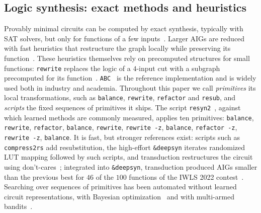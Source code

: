 \documentclass{article}
\begin{document}
\subsection{Logic synthesis: exact methods and heuristics}\label{sec:abc}
Provably minimal circuits can be computed by exact synthesis, typically with SAT solvers, but only for functions of a few inputs~\cite{exact-synthesis}.
Larger AIGs are reduced with fast heuristics that restructure the graph locally while preserving its function~\cite{rewriting,Mishchenko2006ScalableLS,resub}.
These heuristics themselves rely on precomputed structures for small functions: \texttt{rewrite} replaces the logic of a $4$-input cut with a subgraph precomputed for its function~\cite{rewriting}.
\texttt{ABC}~\cite{abc} is the reference implementation and is widely used both in industry and academia.
Throughout this paper we call \emph{primitives} its local transformations, such as \texttt{balance}, \texttt{rewrite}, \texttt{refactor} and \texttt{resub}, and \emph{scripts} the fixed sequences of primitives it ships.
The script \texttt{resyn2}~\cite{rewriting}, against which learned methods are commonly measured, applies ten primitives: \texttt{balance}, \texttt{rewrite}, \texttt{refactor}, \texttt{balance}, \texttt{rewrite}, \texttt{rewrite -z}, \texttt{balance}, \texttt{refactor -z}, \texttt{rewrite -z}, \texttt{balance}.
It is fast, but stronger references exist: scripts such as \texttt{compress2rs} add resubstitution, the high-effort \texttt{\&deepsyn} iterates randomized LUT mapping followed by such scripts, and transduction restructures the circuit using don't-cares~\cite{transduction}; integrated into \texttt{\&deepsyn}, transduction produced AIGs smaller than the previous best for $46$ of the $100$ functions of the IWLS 2022 contest~\cite{randomized-transduction}.
Searching over sequences of primitives has been automated without learned circuit representations, with Bayesian optimization~\cite{bayes} and with multi-armed bandits~\cite{flow-bandits}.
\end{document}
